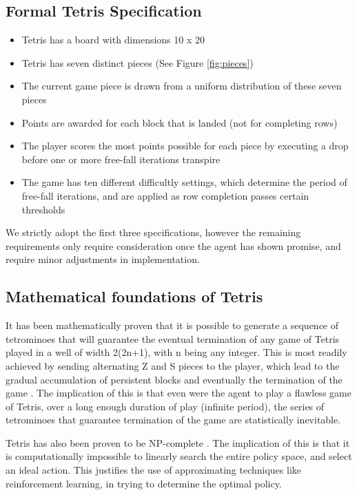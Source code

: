 \documentclass{rucsthesis}
\begin{document}
\subsection*{Formal Tetris Specification \citep{tetstand}} 
\begin{itemize}
\item{Tetris has a board with dimensions 10 x 20}
\item{Tetris has seven distinct pieces (See Figure \ref{fig:pieces})}
\item{The current game piece is drawn from a uniform distribution of these seven pieces}
\item{Points are awarded for each block that is landed (not for completing rows)}
\item{The player scores the most points possible for each piece by executing a drop before one or more free-fall iterations transpire}
\item{The game has ten different difficultly settings, which determine the period of free-fall iterations, and are applied as row completion passes certain thresholds}
\end{itemize}

We strictly adopt the first three specifications, however the remaining requirements only require consideration once the agent has shown promise, and require minor adjustments in implementation. 

\subsection{Mathematical foundations of Tetris}

It has been mathematically proven \citep{mathproof,losetetris} that it is possible to generate a sequence of tetrominoes that will guarantee the eventual termination of any game of Tetris played in a well of width 2(2n+1), with n being any integer. This is most readily achieved by sending alternating Z and S pieces to the player, which lead to the gradual accumulation of persistent blocks and eventually the termination of the game \citep[Chpt. 5]{mathproof}. The implication of this is that even were the agent to play a flawless game of Tetris, over a long enough duration of play (infinite period), the series of tetrominoes that guarantee termination of the game are statistically inevitable.

Tetris has also been proven to be NP-complete \citep{hardtet}. The implication of this is that it is computationally impossible to linearly search the entire policy space, and select an ideal action. This justifies the use of approximating techniques like reinforcement learning, in trying to determine the optimal policy.
\end{document}
